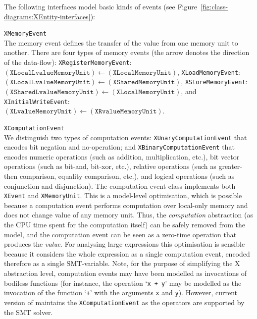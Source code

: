 The following interfaces model basic kinds of events (see Figure~\ref{fig:class-diagrams:XEntity-interfaces}):
\begin{outline}
  \1 \texttt{XMemoryEvent} \\
  The memory event defines the transfer of the value from one memory unit to another.
  There are four types of memory events (the arrow denotes the direction of the data-flow):
  \2 \texttt{XRegisterMemoryEvent}: \\
    $(\texttt{XLocalLvalueMemoryUnit}) \leftarrow (\texttt{XLocalMemoryUnit})$,
  \2 \texttt{XLoadMemoryEvent}: \\
    $(\texttt{XLocalLvalueMemoryUnit}) \leftarrow (\texttt{XSharedMemoryUnit})$,
  \2 \texttt{XStoreMemoryEvent}: \\
    $(\texttt{XSharedLvalueMemoryUnit}) \leftarrow (\texttt{XLocalMemoryUnit})$, and
  \2 \texttt{XInitialWriteEvent}: \\
    $(\texttt{XLvalueMemoryUnit}) \leftarrow (\texttt{XRvalueMemoryUnit})$.

  
  \1 \texttt{XComputationEvent} \\
    We distinguish two types of computation events:
      \2 \texttt{XUnaryComputationEvent} that encodes bit negation and no-operation; and 
      \2 \texttt{XBinaryComputationEvent} that encodes numeric operations (such as addition, multiplication, etc.), bit vector operations (such as bit-and, bit-xor, etc.), relative operations (such as greater-then comparison, equality comparison, etc.), and logical operations (such as conjunction and disjunction). 
    \newline
    The computation event class implements both \texttt{XEvent} and \texttt{XMemoryUnit}.
    This is a model-level optimisation, which is possible because a computation event performs computation over local-only memory and does not change value of any memory unit.
    Thus, the \textit{computation} abstraction (as the CPU time spent for the computation itself) can be safely removed from the model, and the computation event can be seen as a zero-time operation that produces the \textit{value}.
    For analysing large expressions this optimisation is sensible because it considers the whole expression as a single computation event, encoded therefore as a single SMT-variable.
    \newline
    Note, for the purpose of simplifying the X abstraction level, computation events may have been modelled as invocations of bodiless functions (for instance, the operation `\lstinline{x + y}' may be modelled as the invocation of the function `\lstinline{+}' with the arguments \lstinline{x} and \lstinline{y}).
    However, current version of \porthos[2] maintains the \texttt{XComputationEvent} as the operators are supported by the SMT solver.
    

\end{outline}
